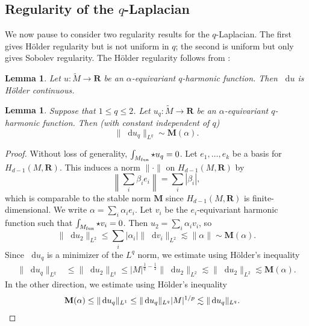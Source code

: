 \documentclass[reqno,11pt]{amsart}
\newcommand{\RR}{\mathbf{R}}
\newcommand*\dif{\mathop{}\!\mathrm{d}}
\newcommand{\Mass}{\mathbf M}
\newtheorem{lemma}[theorem]{Lemma}
\theoremstyle{definition}
\numberwithin{equation}{section}
\begin{document}
\subsection{Regularity of the \texorpdfstring{$q$-Laplacian}{q-Laplacian}}
We now pause to consider two regularity results for the $q$-Laplacian.
The first gives H\"older regularity but is not uniform in $q$; the second is uniform but only gives Sobolev regularity.
The H\"older regularity follows from \cite[Theorem 2]{DIBENEDETTO1983827}:

\begin{lemma}\label{q Laplacian Holder regularity}
Let $u: \tilde M \to \RR$ be an $\alpha$-equivariant $q$-harmonic function.
Then $\dif u$ is H\"older continuous.
\end{lemma}

\begin{lemma}
Suppose that $1 \leq q \leq 2$.
Let $u_q: \tilde M \to \RR$ be an $\alpha$-equivariant $q$-harmonic function.
Then (with constant independent of $q$)
\begin{equation}\label{q Laplacian Sobolev regularity estimate}
\|\dif u_q\|_{L^q} \sim \Mass(\alpha).
\end{equation}
\end{lemma}
\begin{proof}
Without loss of generality, $\int_{M_{\rm fun}} \star u_q = 0$.
Let $e_1, \dots, e_k$ be a basis for $H_{d - 1}(M, \RR)$.
This induces a norm $\|\cdot\|$ on $H_{d - 1}(M, \RR)$ by
$$\left\|\sum_i \beta_i e_i\right\| = \sum_i |\beta_i|,$$
which is comparable to the stable norm $\Mass$ since $H_{d - 1}(M, \RR)$ is finite-dimensional.
We write $\alpha = \sum_i \alpha_i e_i$.
Let $v_i$ be the $e_i$-equivariant harmonic function such that $\int_{M_{\rm fun}} \star v_i = 0$.
Then $u_2 = \sum_i \alpha_i v_i$, so
$$\|\dif u_2\|_{L^2} \leq \sum_i |\alpha_i| \|\dif v_i\|_{L^2} \lesssim \|\alpha\| \sim \Mass(\alpha).$$
Since $\dif u_q$ is a minimizer of the $L^q$ norm, we estimate using H\"older's inequality 
\begin{align*}
\|\dif u_q\|_{L^q} &\leq \|\dif u_2\|_{L^q} \leq |M|^{\frac{1}{q} - \frac{1}{2}} \|\dif u_2\|_{L^2} \lesssim \|\dif u_2\|_{L^2} \lesssim \Mass(\alpha).
\end{align*}
In the other direction, we estimate using H\"older's inequality
\begin{align*}
\Mass(\alpha) &\leq \|\dif u_q\|_{L^1} \leq \|\dif u_q\|_{L^q} |M|^{1/p} \lesssim \|\dif u_q\|_{L^q}. \qedhere 
\end{align*}
\end{proof}
\end{document}
